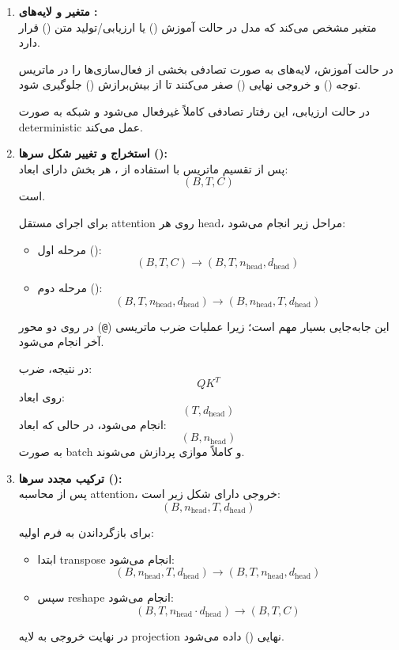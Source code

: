 \documentclass{article}
\begin{document}
\begin{enumerate}
	
	\item \textbf{متغیر  و لایه‌های :} \\
	متغیر  مشخص می‌کند که مدل در حالت آموزش () یا ارزیابی/تولید متن () قرار دارد. 
	
	در حالت آموزش، لایه‌های  به صورت تصادفی بخشی از فعال‌سازی‌ها را در ماتریس توجه () و خروجی نهایی () صفر می‌کنند تا از بیش‌برازش () جلوگیری شود. 
	
	در حالت ارزیابی، این رفتار تصادفی کاملاً غیرفعال می‌شود و شبکه به صورت deterministic عمل می‌کند.
	
	\item \textbf{استخراج و تغییر شکل سرها ():} \\
	پس از تقسیم ماتریس  با استفاده از ، هر بخش دارای ابعاد:
	\[
	(B, T, C)
	\]
	است.
	
	برای اجرای مستقل attention روی هر head، مراحل زیر انجام می‌شود:
	
	\begin{itemize}
		\item مرحله اول ():
		\[
		(B, T, C) \rightarrow (B, T, n_{\text{head}}, d_{\text{head}})
		\]
		
		\item مرحله دوم ():
		\[
		(B, T, n_{\text{head}}, d_{\text{head}})
		\rightarrow
		(B, n_{\text{head}}, T, d_{\text{head}})
		\]
	\end{itemize}
	
	این جابه‌جایی بسیار مهم است؛ زیرا عملیات ضرب ماتریسی (\texttt{@}) در  روی دو محور آخر انجام می‌شود.
	
	در نتیجه، ضرب:
	\[
	QK^{T}
	\]
	روی ابعاد:
	\[
	(T, d_{\text{head}})
	\]
	انجام می‌شود، در حالی که ابعاد:
	\[
	(B, n_{\text{head}})
	\]
	به صورت batch و کاملاً موازی پردازش می‌شوند.
	
	\item \textbf{ترکیب مجدد سرها ():} \\
	پس از محاسبه attention، خروجی دارای شکل زیر است:
	\[
	(B, n_{\text{head}}, T, d_{\text{head}})
	\]
	
	برای بازگرداندن به فرم اولیه:
	
	\begin{itemize}
		\item ابتدا transpose انجام می‌شود:
		\[
		(B, n_{\text{head}}, T, d_{\text{head}})
		\rightarrow
		(B, T, n_{\text{head}}, d_{\text{head}})
		\]
		
		\item سپس reshape انجام می‌شود:
		\[
		(B, T, n_{\text{head}} \cdot d_{\text{head}})
		\rightarrow (B, T, C)
		\]
	\end{itemize}
	
	در نهایت خروجی به لایه projection نهایی () داده می‌شود.
	
\end{enumerate}
\end{document}
